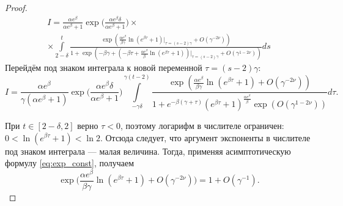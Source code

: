 \begin{proof}
\begin{comment}
\[
I = \int\limits_{\tilde{t}}^{t}\frac{\alpha\exp(x_\gamma^*(s-1)+\beta(s-\tilde{t})-x_\gamma^*(\tilde{t}))}{1+\exp(\gamma x_\gamma^*(s-1))}ds = 
\]
\[
= \int\limits_{2-\delta}^{t}\frac{\alpha\exp(-\beta+\frac1\gamma w_0|_{\tau=(t-2)\gamma}+\Delta_2+\beta(s-2+\delta)-x^*_\gamma(2-\delta))}{1+\exp(-\beta\gamma+ w_0|_{\tau=(t-2)\gamma}+\gamma\Delta_2)}ds=
\]
\[
= \int\limits_{2-\delta}^{t}\frac{\alpha\exp(-\beta+\frac1\gamma (-\beta \tau+\frac{\alpha e^\beta}{\beta}\ln(e^{\beta\tau}+1))|_{\tau=(t-2)\gamma}+\Delta_2+\frac1\gamma\beta\tau+\beta\delta-x^*_\gamma(2-\delta))}{1+\exp(-\beta\gamma+ (-\beta \tau+\frac{\alpha e^\beta}{\beta}\ln(e^{\beta\tau}+1))|_{\tau=(t-2)\gamma}+\gamma\Delta_2)}ds=
\]
\[
= \int\limits_{2-\delta}^{t}\frac{\alpha\exp(-\beta+ \frac{\alpha e^\beta}{\beta\gamma}\ln(e^{\beta\tau}+1)|_{\tau=(t-2)\gamma}+\Delta_2+\beta\delta-(-2\beta+\beta\delta+\ln(\alpha e^{\beta}+1)-\frac{\alpha e^{\beta}\delta}{\alpha e^\beta+1} +\Delta_3))}{1+\exp(-\beta\gamma+ (-\beta \tau+\frac{\alpha e^\beta}{\beta}\ln(e^{\beta\tau}+1))|_{\tau=(t-2)\gamma}+\gamma\Delta_2)}ds=
\]
\end{comment}

\begin{multline*}
I = \frac{\alpha e^\beta}{\alpha e^{\beta}+1}\exp\Big(\frac{\alpha e^{\beta}\delta}{\alpha e^\beta+1}\Big) \times
\\
\times\int\limits_{2-\delta}^{t}\frac{\exp( \frac{\alpha e^\beta}{\beta\gamma}\ln(e^{\beta\tau}+1)|_{\tau=(s-2)\gamma} +O(\gamma^{-2\nu}))}{1+\exp(-\beta\gamma+ (-\beta \tau+\frac{\alpha e^\beta}{\beta}\ln(e^{\beta\tau}+1))|_{\tau=(s-2)\gamma}+O(\gamma^{1 - 2\nu}))}ds
\end{multline*}
%
Перейдём под знаком интеграла к новой переменной $\tau=(s-2)\gamma$:
\small
\begin{equation}
	\label{eq:I_step4}
	I = \frac{\alpha e^\beta}{\gamma(\alpha e^{\beta}+1)}\exp\Big(\frac{\alpha e^{\beta}\delta}{\alpha e^\beta+1}\Big)
	\int\limits_{-\gamma \delta}^{\gamma (t - 2)}\frac{\exp( \frac{\alpha e^\beta}{\beta\gamma}\ln(e^{\beta\tau} + 1) +O(\gamma^{-2\nu}))}{1 + e^{-\beta(\gamma+\tau)}(e^{\beta\tau} + 1)^\frac{\alpha e^\beta}{\beta}\exp(O(\gamma^{1-2\nu}))} d\tau.
\end{equation}
\normalsize

При $t \in [2 - \delta, 2]$ верно $\tau < 0$, поэтому логарифм в числителе ограничен: $0 < \ln(e^{\beta\tau} + 1) < \ln 2$. Отсюда следует, что аргумент экспоненты в числителе под знаком интеграла --- малая величина. Тогда, применяя асимптотическую формулу \eqref{eq:exp_const}, получаем
\begin{equation}
	\label{eq:exp_numerat}
	\exp\Big( \frac{\alpha e^\beta}{\beta \gamma}\ln(e^{\beta\tau}+1) +O(\gamma^{-2\nu})\Big) = 1 + O(\gamma^{-1}).
\end{equation}


\end{proof}

